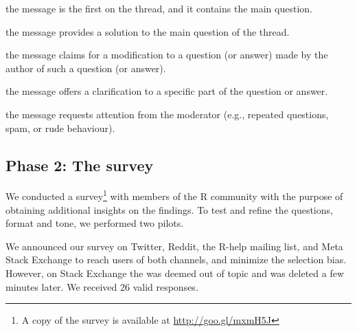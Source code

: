 	\begin{description}[itemsep=3pt, topsep=2pt, leftmargin=3em, parsep=0pt]
		\item[Question:] the message is the first on the thread, and it contains the main question.
		\item[Answer:] the message provides a solution to the main question of the thread.
	 	\item[Update:] the message claims for a modification to a question (or answer) made by the author of such a question (or answer).
		\item[Comment:] the message offers a clarification to a specific part of the question or answer.
		\item[Flag:] the message requests attention from the moderator (e.g., repeated questions, spam, or rude behaviour).
	\end{description}


\subsection{Phase 2: The survey} 

    We conducted a survey\footnote{A copy of the survey is available at \url{http://goo.gl/mxmH5J}} with members of the R community with the purpose of obtaining additional insights on the findings.
    To test and refine the questions, format and tone, we performed two pilots.
    
    We announced our survey on Twitter, Reddit, the R-help mailing list, and Meta Stack Exchange to reach users of both channels, and minimize the selection bias.
    However, on Stack Exchange the was deemed out of topic and was deleted a few minutes later. We received 26 valid responses.

